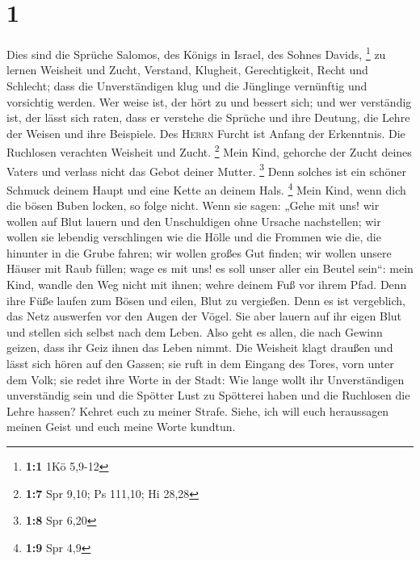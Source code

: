 \hypertarget{section}{%
\section{1}\label{section}}

 Dies sind die Sprüche Salomos, des Königs in Israel, des
Sohnes Davids, \footnote{\textbf{1:1} 1Kö 5,9-12}  zu
lernen Weisheit und Zucht, Verstand,  Klugheit,
Gerechtigkeit, Recht und Schlecht;  dass die
Unverständigen klug und die Jünglinge vernünftig und vorsichtig werden.
 Wer weise ist, der hört zu und bessert sich; und wer
verständig ist, der lässt sich raten,  dass er verstehe
die Sprüche und ihre Deutung, die Lehre der Weisen und ihre Beispiele.
 Des \textsc{Herrn} Furcht ist Anfang der Erkenntnis. Die
Ruchlosen verachten Weisheit und Zucht. \footnote{\textbf{1:7} Spr 9,10;
  Ps 111,10; Hi 28,28}  Mein Kind, gehorche der Zucht
deines Vaters und verlass nicht das Gebot deiner Mutter. \footnote{\textbf{1:8}
  Spr 6,20}  Denn solches ist ein schöner Schmuck deinem
Haupt und eine Kette an deinem Hals. \footnote{\textbf{1:9} Spr 4,9}
 Mein Kind, wenn dich die bösen Buben locken, so folge
nicht.  Wenn sie sagen: „Gehe mit uns! wir wollen auf
Blut lauern und den Unschuldigen ohne Ursache nachstellen;
 wir wollen sie lebendig verschlingen wie die Hölle und
die Frommen wie die, die hinunter in die Grube fahren; 
wir wollen großes Gut finden; wir wollen unsere Häuser mit Raub füllen;
 wage es mit uns! es soll unser aller ein Beutel sein``:
 mein Kind, wandle den Weg nicht mit ihnen; wehre deinem
Fuß vor ihrem Pfad.  Denn ihre Füße laufen zum Bösen und
eilen, Blut zu vergießen.  Denn es ist vergeblich, das
Netz auswerfen vor den Augen der Vögel.  Sie aber lauern
auf ihr eigen Blut und stellen sich selbst nach dem Leben.
 Also geht es allen, die nach Gewinn geizen, dass ihr
Geiz ihnen das Leben nimmt.  Die Weisheit klagt draußen
und lässt sich hören auf den Gassen;  sie ruft in dem
Eingang des Tores, vorn unter dem Volk; sie redet ihre Worte in der
Stadt:  Wie lange wollt ihr Unverständigen unverständig
sein und die Spötter Lust zu Spötterei haben und die Ruchlosen die Lehre
hassen?  Kehret euch zu meiner Strafe. Siehe, ich will
euch heraussagen meinen Geist und euch meine Worte kundtun.
